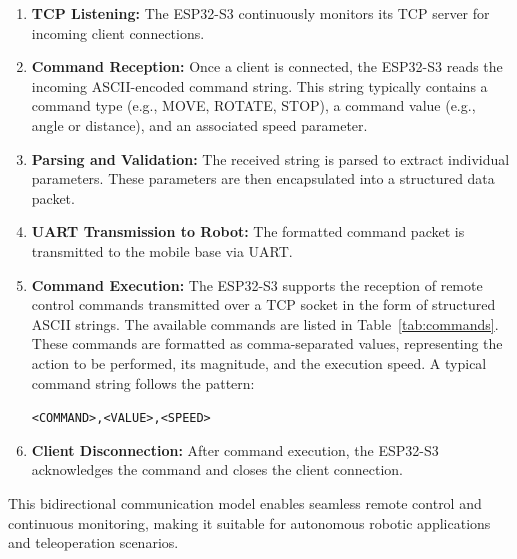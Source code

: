 \begin{enumerate}
	\item \textbf{TCP Listening:} The ESP32-S3 continuously monitors its TCP server for incoming client connections.
	
	\item \textbf{Command Reception:} Once a client is connected, the ESP32-S3 reads the incoming ASCII-encoded command string. This string typically contains a command type (e.g., MOVE, ROTATE, STOP), a command value (e.g., angle or distance), and an associated speed parameter.
	
	\item \textbf{Parsing and Validation:} The received string is parsed to extract individual parameters. These parameters are then encapsulated into a structured data packet.
	
	\item \textbf{UART Transmission to Robot:} The formatted command packet is transmitted to the mobile base via UART.
	
	\item \textbf{Command Execution:} The ESP32-S3 supports the reception of remote control commands transmitted over a TCP socket in the form of structured ASCII strings. The available commands are listed in Table~\ref{tab:commands}. These commands are formatted as comma-separated values, representing the action to be performed, its magnitude, and the execution speed. A typical command string follows the pattern:
	\begin{center}
		\texttt{<COMMAND>,<VALUE>,<SPEED>}
	\end{center}
	
	\item \textbf{Client Disconnection:} After command execution, the ESP32-S3 acknowledges the command and closes the client connection.
\end{enumerate}

This bidirectional communication model enables seamless remote control and continuous monitoring, making it suitable for autonomous robotic applications and teleoperation scenarios.
